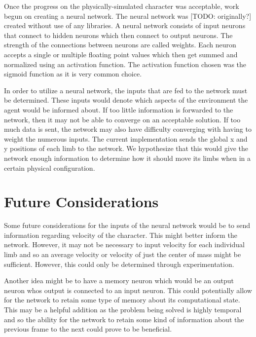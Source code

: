 \documentclass[letterpaper]{article} %
\begin{document}
\par Once the progress on the physically-simulated character was acceptable, work begun on creating a neural network. The neural network was [TODO: originally?] created without use of any libraries. A neural network consists of input neurons that connect to hidden neurons which then connect to output neurons. The strength of the connections between neurons are called weights. Each neuron accepts a single or multiple floating point values which then get summed and normalized using an activation function. The activation function chosen was the sigmoid function as it is very common choice. 

\par In order to utilize a neural network, the inputs that are fed to the network must be determined. These inputs would denote which aspects of the environment the agent would be informed about. If too little information is forwarded to the network, then it may not be able to converge on an acceptable solution. If too much data is sent, the network may also have difficulty converging with having to weight the numerous inputs. The current implementation sends the global x and y positions of each limb to the network. We hypothesize that this would give the network enough information to determine how it should move its limbs when in a certain physical configuration.

\section{Future Considerations}
Some future considerations for the inputs of the neural network would be to send information regarding velocity of the character. This might better inform the network. However, it may not be necessary to input velocity for each individual limb and so an average velocity or velocity of just the center of mass might be sufficient. However, this could only be determined through experimentation.

\par Another idea might be to have a memory neuron which would be an output neuron whos output is connected to an input neuron. This could potentially allow for the network to retain some type of memory about its computational state. This may be a helpful addition as the problem being solved is highly temporal and so the ability for the network to retain some kind of information about the previous frame to the next could prove to be beneficial.
\end{document}

